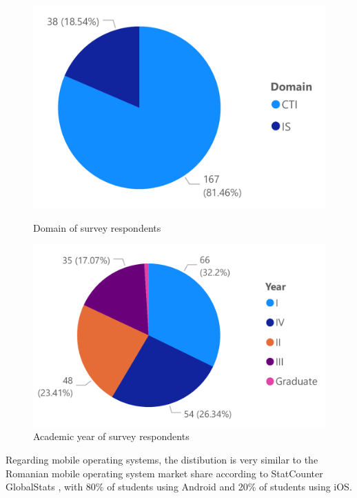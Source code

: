 \begin{figure}[!ht]
    \centering
    \begin{minipage}[b]{0.49\textwidth}
        \captionsetup{justification=centering}
         \includegraphics[height=0.2\textheight]{figures/charts/survey/domain.pdf}
        \caption{Domain of survey respondents}
        \label{3:fig:domain}
    \end{minipage}
    \hfill
    \begin{minipage}[b]{0.49\textwidth}
        \captionsetup{justification=centering}
         \includegraphics[height=0.2\textheight]{figures/charts/survey/year.pdf}
        \caption{Academic year of survey respondents}
        \label{3:fig:year}
    \end{minipage}
\end{figure}

Regarding mobile operating systems, the distibution is very similar to the Romanian mobile operating system market share according to StatCounter GlobalStats \cite{statcounter2020mobile}, with 80\% of students using Android and 20\% of students using iOS.

